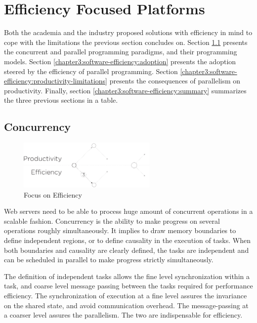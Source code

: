\section{Efficiency Focused Platforms} \label{chapter3:software-efficiency}

Both the academia and the industry proposed solutions with efficiency in mind to cope with the limitations the previous section concludes on.
Section \ref{chapter3:software-efficiency:concurrency} presents the concurrent and parallel programming paradigms, and their programming models. %
Section \ref{chapter3:software-efficiency:adoption} presents the adoption steered by the efficiency of parallel programming.
Section \ref{chapter3:software-efficiency:productivity-limitations} presents the consequences of parallelism on productivity.
Finally, section \ref{chapter3:software-efficiency:summary} summarizes the three previous sections in a table.

\subsection{Concurrency} \label{chapter3:software-efficiency:concurrency}

\begin{figure}[!h]
\begin{center}
\includegraphics[width=0.6\textwidth]{../resources/state-of-the-art-3.pdf}
\end{center}
\caption{Focus on Efficiency}
\label{fig:state-of-the-art-3}
\end{figure}

Web servers need to be able to process huge amount of concurrent operations in a scalable fashion.
Concurrency is the ability to make progress on several operations roughly simultaneously.
It implies to draw memory boundaries to define independent regions, or to define causality in the execution of tasks.
When both boundaries and causality are clearly defined, the tasks are independent and can be scheduled in parallel to make progress strictly simultaneously.

The definition of independent tasks allows the fine level synchronization within a task, and coarse level message passing between the tasks required for performance efficiency.
The synchronization of execution at a fine level assures the invariance on the shared state, and avoid communication overhead.
The message-passing at a coarser level assures the parallelism.
The two are indispensable for efficiency.

